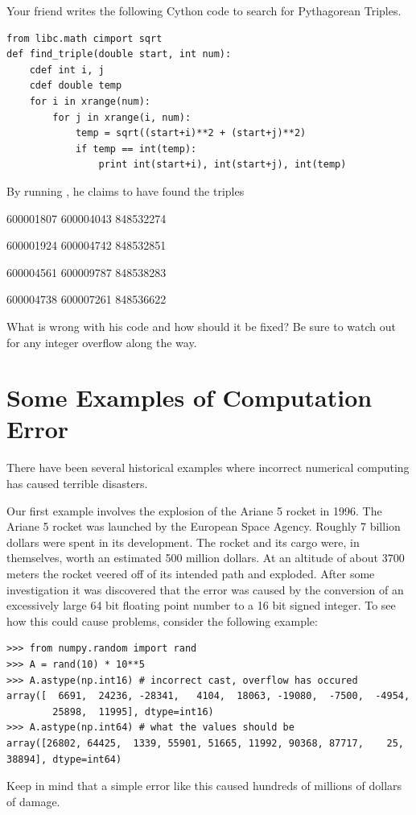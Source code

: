 \begin{problem}
Your friend writes the following Cython code to search for Pythagorean Triples.
\begin{lstlisting}
from libc.math cimport sqrt
def find_triple(double start, int num):
    cdef int i, j
    cdef double temp
    for i in xrange(num):
        for j in xrange(i, num):
            temp = sqrt((start+i)**2 + (start+j)**2)
            if temp == int(temp):
                print int(start+i), int(start+j), int(temp)
\end{lstlisting}
By running , he claims to have found the triples

600001807  600004043  848532274

600001924  600004742  848532851

600004561  600009787  848538283

600004738  600007261  848536622

{\setlength{\parindent}{0cm}
What is wrong with his code and how should it be fixed?
Be sure to watch out for any integer overflow along the way.
}
\end{problem}

\section*{Some Examples of Computation Error}

There have been several historical examples where incorrect numerical computing has caused terrible disasters.

Our first example involves the explosion of the Ariane 5 rocket in 1996.
The Ariane 5 rocket was launched by the European Space Agency.
Roughly 7 billion dollars were spent in its development.
The rocket and its cargo were, in themselves, worth an estimated 500 million dollars.
At an altitude of about 3700 meters the rocket veered off of its intended path and exploded.
After some investigation it was discovered that the error was caused by the conversion of an excessively large 64 bit floating point number to a 16 bit signed integer.
To see how this could cause problems, consider the following example:
\begin{lstlisting}
>>> from numpy.random import rand
>>> A = rand(10) * 10**5
>>> A.astype(np.int16) # incorrect cast, overflow has occured
array([  6691,  24236, -28341,   4104,  18063, -19080,  -7500,  -4954,
        25898,  11995], dtype=int16)
>>> A.astype(np.int64) # what the values should be
array([26802, 64425,  1339, 55901, 51665, 11992, 90368, 87717,    25, 38894], dtype=int64)
\end{lstlisting}
Keep in mind that a simple error like this caused hundreds of millions of dollars of damage.

